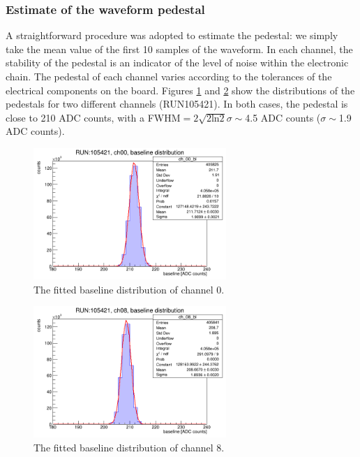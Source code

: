 \subsubsection{Estimate of the waveform pedestal}\label{basel}
A straightforward procedure was adopted to estimate the pedestal: 
we simply take the mean value of the first 
10 samples of the waveform. 
In each channel, the stability of the 
pedestal is an indicator of the 
level of noise within the electronic chain. 
The pedestal of each channel varies 
according to the tolerances of 
the electrical components on the board.
Figures \ref{fig:baseline1} and \ref{fig:baseline2} 
show the distributions of 
the pedestals for two different channels (RUN105421).
In both cases, the pedestal is close to 
210 ADC counts, with a 
FWHM$=2 \sqrt{2 \text{ln}2}\sigma\sim$4.5 
ADC counts ($\sigma \sim$1.9 ADC counts).
  \begin{figure}[!h]
      \centering
      \includegraphics[width=0.65\textwidth]{figures/png/baseline_ch00.png}
      \caption[The fitted baseline distribution of channel 0.]{The fitted baseline distribution of channel 0.}
      \label{fig:baseline1}
  \end{figure}
  \begin{figure}[!h]
      \centering
      \includegraphics[width=0.65\textwidth]{figures/png/baseline_ch08.png}
      \caption[The fitted baseline distribution of channel 8.]{The fitted baseline distribution of channel 8.}
      \label{fig:baseline2}
\end{figure}

